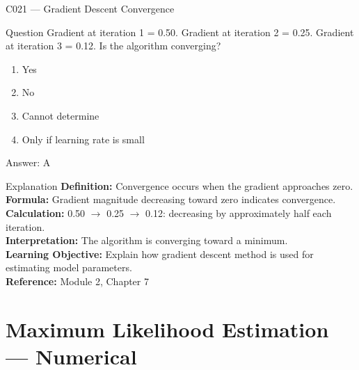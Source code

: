 \documentclass[aspectratio=169,8pt]{beamer}
\begin{document}
	\begin{frame}{C021 --- Gradient Descent Convergence}
		\begin{block}{Question}
			Gradient at iteration 1 = 0.50. Gradient at iteration 2 = 0.25. Gradient at iteration 3 = 0.12. Is the algorithm converging?
			\begin{enumerate}
				\item Yes
				\item No
				\item Cannot determine
				\item Only if learning rate is small
			\end{enumerate}
		\end{block}
		\begin{exampleblock}{Answer: A}\end{exampleblock}
		\begin{block}{Explanation}
			\textbf{Definition:} Convergence occurs when the gradient approaches zero.\\
			\textbf{Formula:} Gradient magnitude decreasing toward zero indicates convergence.\\
			\textbf{Calculation:} 0.50 $\rightarrow$ 0.25 $\rightarrow$ 0.12: decreasing by approximately half each iteration.\\
			\textbf{Interpretation:} The algorithm is converging toward a minimum.\\
			\textbf{Learning Objective:} Explain how gradient descent method is used for estimating model parameters.\\
			\textbf{Reference:} Module 2, Chapter 7
		\end{block}
	\end{frame}
	
	\section{Maximum Likelihood Estimation --- Numerical}
	
\end{document}
